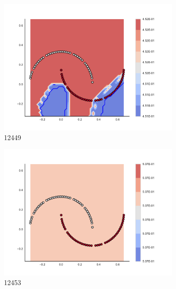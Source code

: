 \begin{figure}[h]
\begin{subfigure}[b]{0.09\textwidth}
    \includegraphics[clip, trim=2.35cm 1.75cm 4.5cm 0cm,width=\textwidth]{img/convergence/12449.pdf}
    \caption{12449}
    \label{fig:convergence_12449}
\end{subfigure}
%
\begin{subfigure}[b]{0.09\textwidth}
    \includegraphics[clip, trim=2.35cm 1.75cm 4.5cm 0cm,width=\textwidth]{img/convergence/12453.pdf}
    \caption{12453}
    \label{fig:convergence_12453}
\end{subfigure}
%
\begin{subfigure}[b]{0.09\textwidth}

\end{subfigure}
\end{figure}
